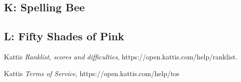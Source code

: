 \documentclass{article}
\begin{document}
\subsection{K: Spelling Bee}



\subsection{L: Fifty Shades of Pink}










\newpage

\begin{thebibliography}{1}
Kattis \emph{Ranklist, scores and difficulties}, https://open.kattis.com/help/ranklist.

Kattis \emph{Terms of Service}, https://open.kattis.com/help/tos

\end{thebibliography}
\end{document}
